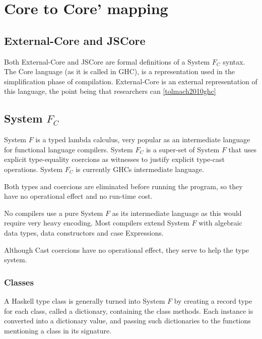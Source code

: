 

\chapter{Core to Core' mapping}
\label{chap:rewrite}

\section{External-Core and JSCore}

Both External-Core and JSCore are formal definitions of a System $F_C$ syntax.
The Core language (as it is called in GHC), is a representation used in the 
simplification phase of compilation. External-Core is an external representation 
of this language, the point being that researchers can 
\ref{tolmach2010ghc}

\section{System $F_C$}

System $F$ is a typed lambda calculus, very popular as an intermediate language
for functional language compilers. System $F_C$ is a super-set of System $F$ 
that uses explicit type-equality coercions as witnesses to justify explicit
type-cast operations. System $F_C$ is currently GHCs intermediate language.
\cite{sulzmann2007system}

Both types and coercions are eliminated before running the program, so they have
no operational effect and no run-time cost.
\cite{sulzmann2007system}

No compilers use a pure System $F$ as its intermediate language as this would
require very heavy encoding. Most compilers extend System $F$ with algebraic
data types, data constructors and case Expressions.
\cite{sulzmann2007system}

Although Cast coercions have no operational effect, they serve to help the
type system.

\subsection{Classes}
\label{subsec:classes}

A Haskell type class is generally turned into System $F$ by creating a 
record type for each class, called a dictionary, containing the class methods.
Each instance is converted into a dictionary value, and passing such 
dictionaries to the functions mentioning a class in its signature. 
\cite{sulzmann2007system}

